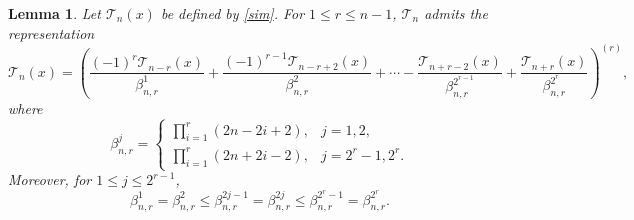 \documentclass[12pt,a4paper]{article}
\newtheorem{lemma}[theorem]{Lemma}
\begin{document}
\begin{lemma}\label{key}
    Let $\mathcal{T}_n(x)$ be defined by \eqref{sim}. For $1\le r\le n-1$, $\mathcal{T}_n$
    admits the representation
    \[
    \mathcal{T}_n(x)=\left(
    \frac{(-1)^r\mathcal{T}_{n-r}(x)}{\beta^1_{n,r}}
    +\frac{(-1)^{r-1}\mathcal{T}_{n-r+2}(x)}{\beta^2_{n,r}}
    +\cdots
    -\frac{\mathcal{T}_{n+r-2}(x)}{\beta^{2^{r-1}}_{n,r}}
    +\frac{\mathcal{T}_{n+r}(x)}{\beta^{2^{r}}_{n,r}}
    \right)^{(r)},
    \]
    where
    \[
    \beta^j_{n,r}=
    \begin{cases}
    \displaystyle\prod_{i=1}^{r}(2n-2i+2), & j=1,2,\\[4pt]
    \displaystyle\prod_{i=1}^{r}(2n+2i-2), & j=2^{r}-1,2^r.
    \end{cases}
    \]
    Moreover, for $1\le j\le 2^{r-1}$,
    \[
    \beta^1_{n,r}=\beta^2_{n,r}
    \le \beta^{2j-1}_{n,r}=\beta^{2j}_{n,r}
    \le \beta^{2^{r}-1}_{n,r}=\beta^{2^{r}}_{n,r}.
    \]
\end{lemma}
\end{document}
